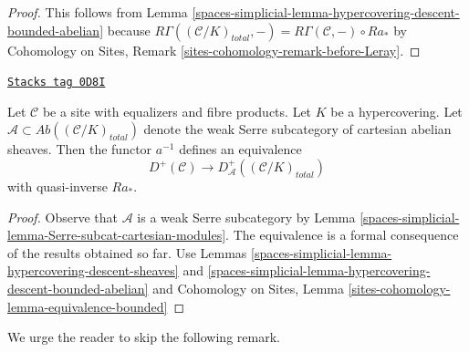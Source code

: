 \begin{proof}
This follows from Lemma \ref{spaces-simplicial-lemma-hypercovering-descent-bounded-abelian}
because $R\Gamma((\mathcal{C}/K)_{total}, -) =
R\Gamma(\mathcal{C}, -) \circ Ra_*$ by
Cohomology on Sites, Remark \ref{sites-cohomology-remark-before-Leray}.
\end{proof}

\begin{lemma}
\label{spaces-simplicial-lemma-hypercovering-equivalence-bounded}
\href{https://stacks.math.columbia.edu/tag/0D8I}{\texttt{Stacks tag 0D8I}}

Let $\mathcal{C}$ be a site with equalizers and fibre products.
Let $K$ be a hypercovering.
Let $\mathcal{A} \subset \textit{Ab}((\mathcal{C}/K)_{total})$
denote the weak Serre subcategory of cartesian abelian sheaves.
Then the functor $a^{-1}$ defines an equivalence
$$
D^+(\mathcal{C}) \longrightarrow D_\mathcal{A}^+((\mathcal{C}/K)_{total})
$$
with quasi-inverse $Ra_*$.
\end{lemma}

\begin{proof}
Observe that $\mathcal{A}$ is a weak Serre subcategory by
Lemma \ref{spaces-simplicial-lemma-Serre-subcat-cartesian-modules}.
The equivalence is a
formal consequence of the results obtained so far. Use
Lemmas \ref{spaces-simplicial-lemma-hypercovering-descent-sheaves} and
\ref{spaces-simplicial-lemma-hypercovering-descent-bounded-abelian} and
Cohomology on Sites, Lemma \ref{sites-cohomology-lemma-equivalence-bounded}
\end{proof}

We urge the reader to skip the following remark.

